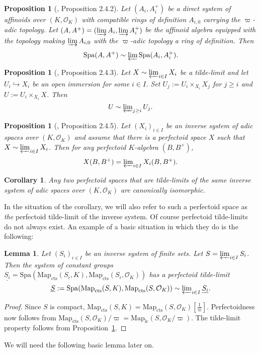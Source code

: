 \documentclass[10pt,oneside]{amsart}
\newtheorem{lemma}[theorem]{Lemma}
\newtheorem{proposition}[theorem]{Proposition}
\newtheorem{corollary}[theorem]{Corollary}
\theoremstyle{definition}
\renewcommand{\O}{\mathcal{O}}
\begin{document}
\begin{proposition}[\cite{SW}, Proposition 2.4.2]\label{SW Proposition 2.4.2}
	Let $(A_i,A_i^{+})$ be a direct system of affinoids over $(K,\mathcal O_K)$ with compatible rings of definition $A_{i,0}$ carrying the $\varpi$-adic topology. Let $(A,A^{+})=(\varinjlim A_i,\varinjlim A_i^{+})$ be the affinoid algebra equipped with the topology making $\varinjlim A_{i,0}$ with the $\varpi$-adic topology a ring of definition. Then
	\[\operatorname{Spa}(A,A^{+})\sim \textstyle\varprojlim \operatorname{Spa}(A_i,A_i^{+}).\]
\end{proposition}
\begin{proposition}[\cite{SW}, Proposition 2.4.3]\label{SW Proposition 2.4.3}
	Let $X\sim \varprojlim_{i\in I} X_i$ be a tilde-limit and let $U_i\hookrightarrow X_i$ be an open immersion for some $i\in I$. Set $U_j:=U_i\times_{X_i}X_j$ for $j\geq i$ and $U:=U_i\times_{X_i}X$. Then 
	\[U\sim \textstyle\varprojlim_{j\geq i} U_j.\]
\end{proposition}

\begin{proposition}[\cite{SW}, Proposition 2.4.5]\label{SW Proposition 2.4.5}
	Let $(X_i)_{i\in I}$ be an inverse system of adic spaces over $(K,\mathcal O_K)$ and assume that there is a perfectoid space $X$ such that $X\sim \varprojlim_{i\in I} X_i$. Then for any perfectoid $K$-algebra $(B,B^{+})$, 
	\[X(B,B^{+})  = \textstyle\varprojlim_{i\in I}X_i(B,B^{+}).\]
\end{proposition}
\begin{corollary}\label{corollary: perfectoid tilde limit is unique}
	Any two perfectoid spaces that are tilde-limits of the same inverse system of adic spaces over $(K,\mathcal O_K)$ are canonically isomorphic.
\end{corollary}
In the situation of the corollary, we will also refer to such a perfectoid space as \textit{the} perfectoid tilde-limit of the inverse system. Of course perfectoid tilde-limits do not always exist. An example of a basic situation in which they do is the following:
\begin{lemma}\label{l:pro-finite-perfectoid-spaces}
	Let $(S_i)_{i\in I}$ be an inverse system of finite sets. Let $S=\varprojlim_{i\in I} S_i$. Then the system of constant groups $\underline{S_i}=\mathrm{Spa}(\mathrm{Map}_{\mathrm{cts}}(S_i,K),\mathrm{Map}_{\mathrm{cts}}(S_i,\O_K))$ has a perfectoid tilde-limit	\[\underline{S}:=\mathrm{Spa}(\mathrm{Map}_{\mathrm{cts}}(S,K),\mathrm{Map}_{\mathrm{cts}}(S,\O_K))\sim\textstyle\varprojlim_{i\in I} \underline{S_i}.\]
\end{lemma}
\begin{proof}
	Since $S$ is compact, $\mathrm{Map}_{\mathrm{cts}}(S,K)=\mathrm{Map}_{\mathrm{cts}}(S,\O_K)[\tfrac{1}{\varpi}]$. Perfectoidness now follows from $\mathrm{Map}_{\mathrm{cts}}(S,\O_K)/\varpi=\mathrm{Map}_{\mathrm{lc}}(S,\O_K/\varpi)$. The tilde-limit property follows from Proposition~\ref{SW Proposition 2.4.2}.
\end{proof}
We will need the following basic lemma later on.
\end{document}
